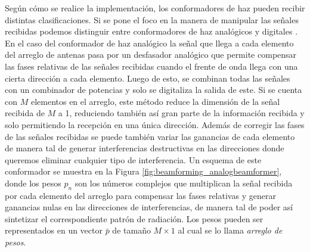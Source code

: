 Según cómo se realice la implementación, los conformadores de haz pueden recibir distintas clasificaciones. Si se pone el foco en la manera de manipular las señales recibidas podemos distinguir entre conformadores de haz analógicos y digitales \cite{bib:steiskal}. En el caso del conformador de haz analógico la señal que llega a cada elemento del arreglo de antenas pasa por un desfasador analógico que permite compensar las fases relativas de las señales recibidas cuando el frente de onda llega con una cierta dirección a cada elemento. Luego de esto, se combinan todas las señales con un combinador de potencias y solo se digitaliza la salida de este. Si se cuenta con $M$ elementos en el arreglo, este método reduce la dimensión de la señal recibida de $M$ a 1, reduciendo también así gran parte de la información recibida y solo permitiendo la recepción en una única dirección. Además de corregir las fases de las señales recibidas se puede también variar las ganancias de cada elemento de manera tal de generar interferencias destructivas en las direcciones donde queremos eliminar cualquier tipo de interferencia. Un esquema de este conformador se muestra en la Figura \ref{fig:beamforming_analogbeamformer}, donde los pesos $p_n$ son los números complejos que multiplican la señal recibida por cada elemento del arreglo para compensar las fases relativas y generar ganancias nulas en las direcciones de interferencias, de manera tal de poder así sintetizar el correspondiente patrón de radiación. Los pesos pueden ser representados en un vector $\bar{p}$ de tamaño $M\times 1$ al cual se lo llama \emph{arreglo de pesos}.

